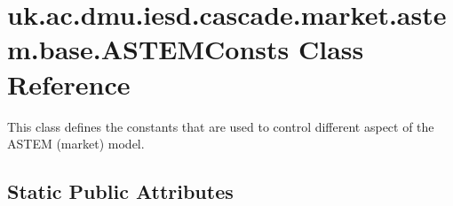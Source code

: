 \hypertarget{classuk_1_1ac_1_1dmu_1_1iesd_1_1cascade_1_1market_1_1astem_1_1base_1_1_a_s_t_e_m_consts}{\section{uk.\-ac.\-dmu.\-iesd.\-cascade.\-market.\-astem.\-base.\-A\-S\-T\-E\-M\-Consts Class Reference}
\label{classuk_1_1ac_1_1dmu_1_1iesd_1_1cascade_1_1market_1_1astem_1_1base_1_1_a_s_t_e_m_consts}
}


This class defines the constants that are used to control different aspect of the A\-S\-T\-E\-M (market) model.  


\subsection*{Static Public Attributes}
